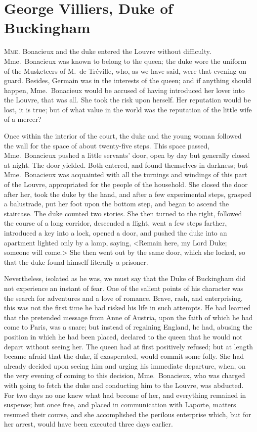
\chapter{George Villiers, Duke of Buckingham}

\lettrine{M}{me}. Bonacieux and the duke entered the Louvre without difficulty. Mme.~Bonacieux was known to belong to the queen; the duke wore the uniform of the Musketeers of M.~de Tréville, who, as we have said, were that evening on guard. Besides, Germain was in the interests of the queen; and if anything should happen, Mme.~Bonacieux would be accused of having introduced her lover into the Louvre, that was all. She took the risk upon herself. Her reputation would be lost, it is true; but of what value in the world was the reputation of the little wife of a mercer? 

Once within the interior of the court, the duke and the young woman followed the wall for the space of about twenty-five steps. This space passed, Mme.~Bonacieux pushed a little servants' door, open by day but generally closed at night. The door yielded. Both entered, and found themselves in darkness; but Mme.~Bonacieux was acquainted with all the turnings and windings of this part of the Louvre, appropriated for the people of the household. She closed the door after her, took the duke by the hand, and after a few experimental steps, grasped a balustrade, put her foot upon the bottom step, and began to ascend the staircase. The duke counted two stories. She then turned to the right, followed the course of a long corridor, descended a flight, went a few steps farther, introduced a key into a lock, opened a door, and pushed the duke into an apartment lighted only by a lamp, saying, <Remain here, my Lord Duke; someone will come.> She then went out by the same door, which she locked, so that the duke found himself literally a prisoner. 

Nevertheless, isolated as he was, we must say that the Duke of Buckingham did not experience an instant of fear. One of the salient points of his character was the search for adventures and a love of romance. Brave, rash, and enterprising, this was not the first time he had risked his life in such attempts. He had learned that the pretended message from Anne of Austria, upon the faith of which he had come to Paris, was a snare; but instead of regaining England, he had, abusing the position in which he had been placed, declared to the queen that he would not depart without seeing her. The queen had at first positively refused; but at length became afraid that the duke, if exasperated, would commit some folly. She had already decided upon seeing him and urging his immediate departure, when, on the very evening of coming to this decision, Mme.~Bonacieux, who was charged with going to fetch the duke and conducting him to the Louvre, was abducted. For two days no one knew what had become of her, and everything remained in suspense; but once free, and placed in communication with Laporte, matters resumed their course, and she accomplished the perilous enterprise which, but for her arrest, would have been executed three days earlier. 

